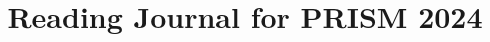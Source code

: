 \documentclass{article}
\begin{document}

\title{Reading Journal for PRISM 2024}
\author{}
\date{}
\maketitle




\end{document}
